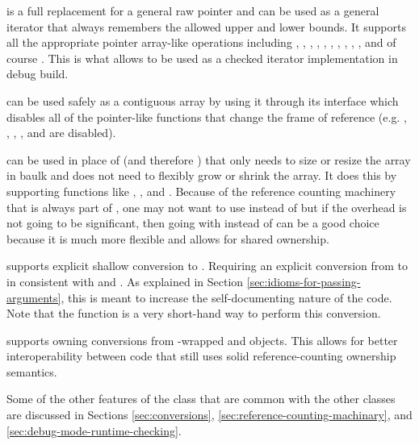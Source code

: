 \documentclass[pdf,ps2pdf,11pt]{SANDreport}
\begin{document}
{} is a full replacement for a general raw
pointer and can be used as a general iterator that always remembers
the allowed upper and lower bounds.  It supports all the appropriate
pointer array-like operations including {},
{}, {}, {},
{}, , {}, {},
{}, {}, and of course
{}.  This is what allows {} to be used
as a checked iterator implementation in debug build.

{} can be used safely as a contiguous array by
using it through its {} interface which disables all of
the pointer-like functions that change the frame of reference
(e.g. {}, {}, , {}, and
{} are disabled).

{} can be used in place of {} (and
therefore {}) that only needs to size or resize the array
in baulk and does not need to flexibly grow or shrink the array.  It
does this by supporting functions like {},
{}, and {}.  Because of the reference
counting machinery that is always part of {}, one may
not want to use {} instead of {} but if the
overhead is not going to be significant, then going with
{} instead of {} can be a good choice because
it is much more flexible and allows for shared ownership.

{} supports explicit shallow conversion to
{}.  Requiring an explicit conversion from
{} to {} in consistent with
{} and {}.  As explained in Section
{}\ref{sec:idioms-for-passing-arguments}, this is meant to increase
the self-documenting nature of the code.  Note that the
{} function is a very short-hand way to
perform this conversion.

{} supports owning conversions from
{}-wrapped {} and {}
objects.  This allows for better interoperability between code that
still uses solid reference-counting ownership semantics.

Some of the other features of the {} class that are
common with the other classes are discussed in Sections
{}\ref{sec:conversions}, {}\ref{sec:reference-counting-machinary}, and
{}\ref{sec:debug-mode-runtime-checking}.
\end{document}
